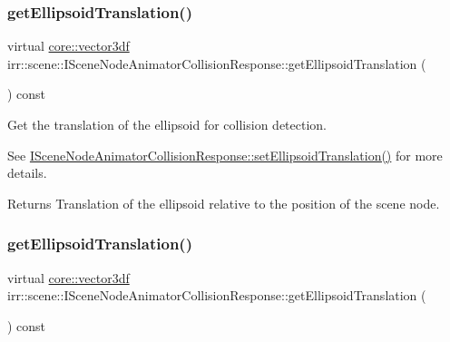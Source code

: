\subsubsection{\texorpdfstring{get\+Ellipsoid\+Translation()}{getEllipsoidTranslation()}\hspace{0.1cm}{\footnotesize\ttfamily [1/2]}}
{\footnotesize\ttfamily virtual \hyperlink{namespaceirr_1_1core_ae6e2b2a6c552833ebbd5b7463d03586b}{core\+::vector3df} irr\+::scene\+::\+I\+Scene\+Node\+Animator\+Collision\+Response\+::get\+Ellipsoid\+Translation (\begin{DoxyParamCaption}{ }\end{DoxyParamCaption}) const\hspace{0.3cm}{\ttfamily [pure virtual]}}



Get the translation of the ellipsoid for collision detection. 

See \hyperlink{classirr_1_1scene_1_1ISceneNodeAnimatorCollisionResponse_a234ec747d320d70dd3e2a4143782ffc7}{I\+Scene\+Node\+Animator\+Collision\+Response\+::set\+Ellipsoid\+Translation()} for more details. \begin{DoxyReturn}{Returns}
Translation of the ellipsoid relative to the position of the scene node. 
\end{DoxyReturn}
\mbox{\label{classirr_1_1scene_1_1ISceneNodeAnimatorCollisionResponse_aff0a2ad6ff375a85e08a3226e3267286}} 
\subsubsection{\texorpdfstring{get\+Ellipsoid\+Translation()}{getEllipsoidTranslation()}\hspace{0.1cm}{\footnotesize\ttfamily [2/2]}}
{\footnotesize\ttfamily virtual \hyperlink{namespaceirr_1_1core_ae6e2b2a6c552833ebbd5b7463d03586b}{core\+::vector3df} irr\+::scene\+::\+I\+Scene\+Node\+Animator\+Collision\+Response\+::get\+Ellipsoid\+Translation (\begin{DoxyParamCaption}{ }\end{DoxyParamCaption}) const\hspace{0.3cm}{\ttfamily [pure virtual]}}



